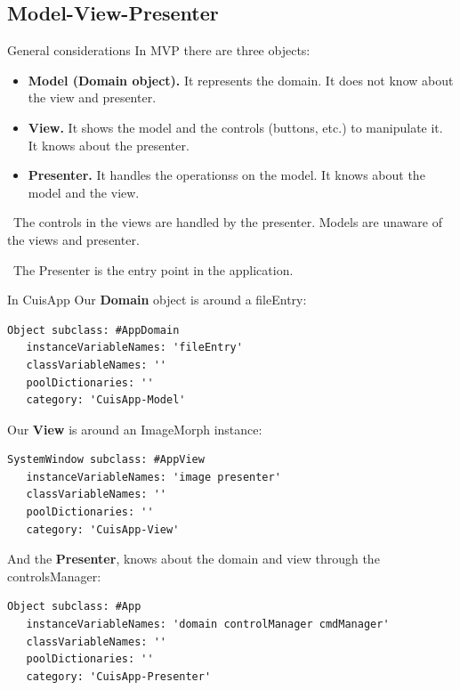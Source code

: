\documentclass{beamer}
\newcommand{\tip}{\boldmath{\textcolor{red}{$\Rightarrow$}}}
\begin{document}
\subsection{Model-View-Presenter}
\begin{frame}{General considerations}
  In MVP\cite{guiArch} there are three objects:

  \begin{itemize}
  \item \textbf{Model (Domain object).} It represents the domain. It
    does not know about the view and presenter.
  \item \textbf{View.} It shows the model and the controls (buttons,
    etc.) to manipulate it. It knows about the presenter.
  \item \textbf{Presenter.} It handles the operationss on the model. It
    knows about the model and the view.
  \end{itemize}

  \tip\ The controls in the views are handled by the presenter. Models
  are unaware of the views and presenter.

  \tip\ The Presenter is the entry point in the application.
\end{frame}

\begin{frame}[fragile]{In CuisApp}
  \fontsize{10pt}{8pt}\selectfont
  Our \textbf{Domain} object is around a fileEntry:
  \begin{lstlisting}[language=Smalltalk]
Object subclass: #AppDomain
   instanceVariableNames: 'fileEntry'
   classVariableNames: ''
   poolDictionaries: ''
   category: 'CuisApp-Model'
 \end{lstlisting}
 Our \textbf{View} is around an ImageMorph instance:
 \begin{lstlisting}[language=Smalltalk]
SystemWindow subclass: #AppView
   instanceVariableNames: 'image presenter'
   classVariableNames: ''
   poolDictionaries: ''
   category: 'CuisApp-View'   
 \end{lstlisting}
 And the \textbf{Presenter}, knows about the domain and view through
 the controlsManager:
 \begin{lstlisting}[language=Smalltalk]
Object subclass: #App
   instanceVariableNames: 'domain controlManager cmdManager'
   classVariableNames: ''
   poolDictionaries: ''
   category: 'CuisApp-Presenter'   
 \end{lstlisting}
\end{frame}
\end{document}
